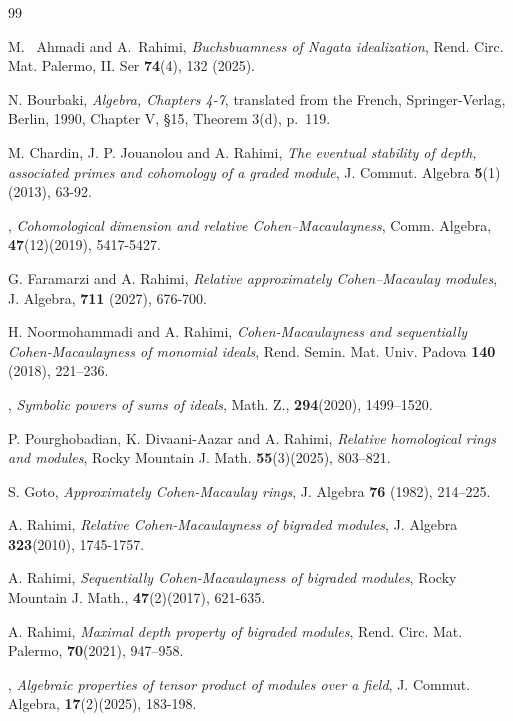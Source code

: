 \documentclass[10pt,a4paper]{amsart}
\numberwithin{equation}{theorem}
\theoremstyle{definition}
\theoremstyle{fact}
\theoremstyle{conjecture}
\begin{document}
\begin{thebibliography}{99}

 M. ~Ahmadi and A.~Rahimi, {\it Buchsbuamness of Nagata idealization}, Rend. Circ. Mat. Palermo, II. Ser {\bf 74}(4), 132 (2025).


 {N. Bourbaki}, {\it Algebra, Chapters 4-7}, translated from the French, Springer-Verlag, Berlin, 1990, Chapter V, \S 15, Theorem 3(d), p.~119.

 {M. Chardin, J. P. Jouanolou and A. Rahimi}, {\it The eventual stability of
depth, associated primes and cohomology of a graded module}, J. Commut. Algebra {\bf 5}(1)(2013), 63-92.


, {\it Cohomological dimension and relative
Cohen--Macaulayness}, Comm. Algebra, {\bf 47}(12)(2019), 5417-5427.

G. Faramarzi and A. Rahimi,
\textit{Relative approximately Cohen--Macaulay modules}, J. Algebra, \textbf{711} (2027), 676-700.


 {H. Noormohammadi and A. Rahimi}, {\it Cohen-Macaulayness and sequentially Cohen-Macaulayness
of monomial ideals}, Rend. Semin. Mat. Univ. Padova {\bf 140} (2018), 221–236.

, {\it Symbolic powers of sums of ideals}, Math. Z., {\bf 294}(2020), 1499–1520.

 P. Pourghobadian, K. Divaani-Aazar and A. Rahimi, \textit {Relative homological rings and modules}, Rocky Mountain J. Math. {\bf 55}(3)(2025), 803–821.

S. Goto, \textit{Approximately Cohen-Macaulay rings}, J. Algebra {\bf 76} (1982), 214–225.

 {A. Rahimi}, {\it Relative Cohen-Macaulayness of bigraded modules}, J. Algebra {\bf 323}(2010),  1745-1757.

 {A. Rahimi},   {\it Sequentially Cohen-Macaulayness of bigraded modules}, Rocky Mountain J. Math., {\bf 47}(2)(2017), 621-635.

 {A. Rahimi}, {\it  Maximal depth property of bigraded modules}, Rend. Circ. Mat. Palermo, {\bf 70}(2021), 947–958.

, {\it Algebraic properties of tensor product of modules over a field}, J. Commut. Algebra, {\bf 17}(2)(2025), 183-198.


\end{thebibliography}
\end{document}
